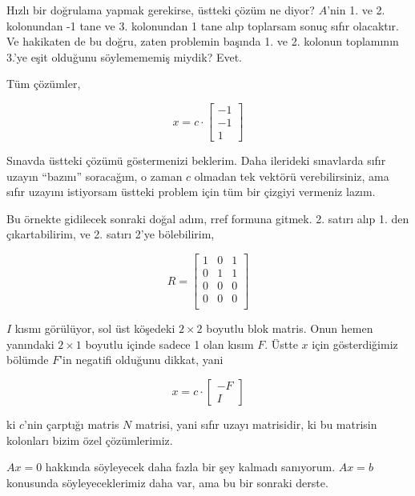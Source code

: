\documentclass[12pt,fleqn]{article}\usepackage{../../common}
\begin{document}
Hızlı bir doğrulama yapmak gerekirse, üstteki çözüm ne diyor? $A$'nin
1. ve 2. kolonundan -1 tane ve 3. kolonundan 1 tane alıp toplarsam sonuç
sıfır olacaktır. Ve hakikaten de bu doğru, zaten problemin başında 1. ve
2. kolonun toplamının 3.'ye eşit olduğunu söylemememiş miydik? Evet.

Tüm çözümler, 

$$ x = 
c \cdot \left[\begin{array}{r}
-1\\
-1\\
1
\end{array}\right]
 $$

Sınavda üstteki çözümü göstermenizi beklerim. Daha ilerideki sınavlarda
sıfır uzayın ``bazını'' soracağım, o zaman $c$ olmadan tek vektörü
verebilirsiniz, ama sıfır uzayını istiyorsam üstteki problem için tüm bir
çizgiyi vermeniz lazım. 

Bu örnekte gidilecek sonraki doğal adım, rref formuna gitmek. 2. satırı
alıp 1. den çıkartabilirim, ve 2. satırı 2'ye bölebilirim, 

$$ 
R = \left[\begin{array}{rrr}
1 & 0 & 1 \\
0 & 1 & 1 \\
0 & 0 & 0 \\
0 & 0 & 0 \\
\end{array}\right]
 $$

$I$ kısmı görülüyor, sol üst köşedeki $2 \times 2$ boyutlu blok
matris. Onun hemen yanındaki $2 \times 1$ boyutlu içinde sadece 1 olan
kısım $F$. Üstte $x$ için gösterdiğimiz bölümde $F$'in negatifi olduğunu
dikkat, yani 

$$ x = 
c \cdot \left[\begin{array}{r}
-F \\
I
\end{array}\right]
 $$

ki $c$'nin çarptığı matris $N$ matrisi, yani sıfır uzayı matrisidir, ki bu
matrisin kolonları bizim özel çözümlerimiz. 

$Ax=0$ hakkında söyleyecek daha fazla bir şey kalmadı sanıyorum. $Ax=b$
konusunda söyleyeceklerimiz daha var, ama bu bir sonraki derste. 
\end{document}
